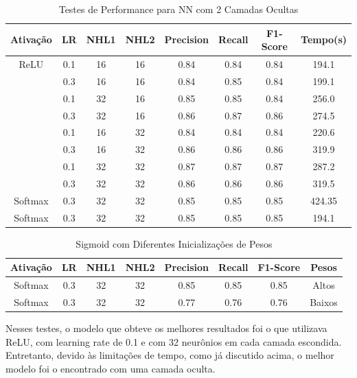\documentclass[conference]{IEEEtran}
\begin{document}
\begin{table}[h!]
 \begin{center}
  \caption{Testes de Performance para NN com 2 Camadas Ocultas}
  \label{table:table2}
  \begin{tabular}{ |c|c|c|c|c|c|c|c| }
   \hline
   Ativação & LR & NHL1 & NHL2 & Precision & Recall & F1-Score & Tempo(s)\\
   \hline
   ReLU & 0.1 & 16 & 16 & 0.84 & 0.84 & 0.84 & 194.1 \\
        & 0.3 & 16 & 16 & 0.84 & 0.85 & 0.84 & 199.1 \\
        & 0.1 & 32 & 16 & 0.85 & 0.85 & 0.84 & 256.0 \\
        & 0.3 & 32 & 16 & 0.86 & 0.87 & 0.86 & 274.5 \\
        & 0.1 & 16 & 32 & 0.84 & 0.84 & 0.84 & 220.6 \\
        & 0.3 & 16 & 32 & 0.86 & 0.86 & 0.86 & 319.9 \\
        & 0.1 & 32 & 32 & 0.87 & 0.87 & 0.87 & 287.2 \\
        & 0.3 & 32 & 32 & 0.86 & 0.86 & 0.86 & 319.5 \\
   \hline
   Softmax & 0.3 & 32 & 32 & 0.85 & 0.85 & 0.85 & 424.35 \\
   Softmax & 0.3 & 32 & 32 & 0.85 & 0.85 & 0.85 & 194.1 \\

 \hline
 \end{tabular}
 \end{center}
\end{table}

\begin{table}[h!]
 \begin{center}
  \caption{Sigmoid com Diferentes Inicializações de Pesos}
  \label{table:table3}
  \begin{tabular}{ |c|c|c|c|c|c|c|c| }
   \hline
   Ativação & LR & NHL1 & NHL2 & Precision & Recall & F1-Score & Pesos\\
   \hline
   Softmax & 0.3 & 32 & 32 & 0.85 & 0.85 & 0.85 & Altos \\
   Softmax & 0.3 & 32 & 32 & 0.77 & 0.76 & 0.76 & Baixos \\
   \hline
 \end{tabular}
 \end{center}
\end{table}

	Nesses testes, o modelo que obteve os melhores resultados foi o que utilizava ReLU, com learning rate de 0.1 e com 32 neurônios em cada camada escondida. Entretanto, devido às limitações de tempo, como já discutido acima, o melhor modelo foi o encontrado com uma camada oculta.
	
\end{document}

